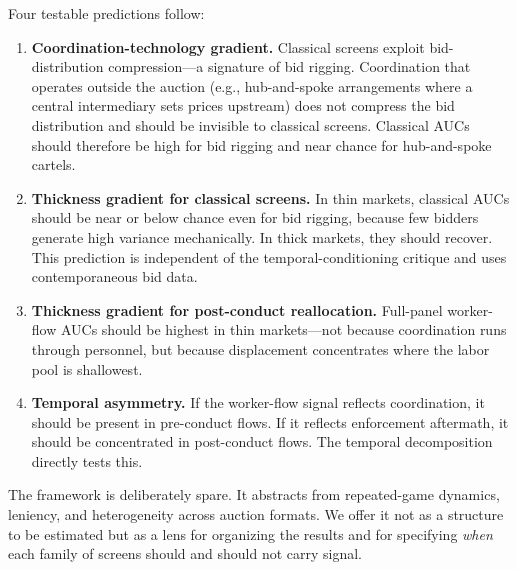 Four testable predictions follow:

\begin{enumerate}
\item \textbf{Coordination-technology gradient.} Classical screens exploit bid-distribution compression---a signature of bid rigging. Coordination that operates outside the auction (e.g., hub-and-spoke arrangements where a central intermediary sets prices upstream) does not compress the bid distribution and should be invisible to classical screens. Classical AUCs should therefore be high for bid rigging and near chance for hub-and-spoke cartels.

\item \textbf{Thickness gradient for classical screens.} In thin markets, classical AUCs should be near or below chance even for bid rigging, because few bidders generate high variance mechanically. In thick markets, they should recover. This prediction is independent of the temporal-conditioning critique and uses contemporaneous bid data.

\item \textbf{Thickness gradient for post-conduct reallocation.} Full-panel worker-flow AUCs should be highest in thin markets---not because coordination runs through personnel, but because displacement concentrates where the labor pool is shallowest.

\item \textbf{Temporal asymmetry.} If the worker-flow signal reflects coordination, it should be present in pre-conduct flows. If it reflects enforcement aftermath, it should be concentrated in post-conduct flows. The temporal decomposition directly tests this.
\end{enumerate}

The framework is deliberately spare. It abstracts from repeated-game dynamics, leniency, and heterogeneity across auction formats. We offer it not as a structure to be estimated but as a lens for organizing the results and for specifying \emph{when} each family of screens should and should not carry signal.
